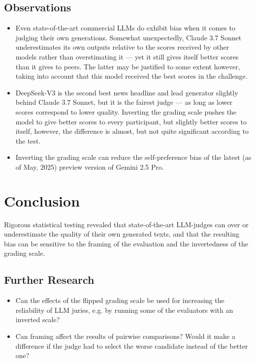 \documentclass[noindent,nohyp,parspace,titlepage,twoside,12pt]{article}
\begin{document}
    \subsection{Observations}

      \begin{itemize}
        \item Even state-of-the-art commercial LLMs do exhibit bias when it
              comes to judging their own generations. Somewhat unexpectedly,
              Claude 3.7 Sonnet underestimates its own outputs relative to the
              scores received by other models rather than overstimating it ---
              yet it still gives itself better scores than it gives to peers.
              The latter may be justified to some extent however, taking into
              account that this model received the best scores in the
              challenge.

        \item DeepSeek-V3 is the second best news headline and lead generator
              slightly behind Claude 3.7 Sonnet, but it is the fairest judge
              --- as long as lower scores correspond to lower quality. Inverting
              the grading scale pushes the model to give better scores to every
              participant, but slightly better scores to itself, however, the
              difference is almost, but not quite significant according to the
              test.

        \item Inverting the grading scale can reduce the self-preference bias of
              the latest (as of May, 2025) preview version of Gemini 2.5 Pro.
      \end{itemize}

  \section{Conclusion}

    Rigorous statistical testing revealed that state-of-the-art LLM-judges can
    over or underestimate the quality of their own generated texts, and that
    the resulting bias can be sensitive to the framing of the evaluation and
    the invertedness of the grading scale.

    \subsection{Further Research}

      \begin{itemize}
        \item Can the effects of the flipped grading scale be used for
              increasing the reliability of LLM juries, e.g. by running some of
              the evaluators with an inverted scale?

        \item Can framing affect the results of pairwise comparisons? Would it
              make a difference if the judge had to select the worse candidate
              instead of the better one?
      \end{itemize}
\end{document}
